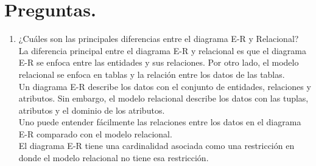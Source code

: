 \documentclass[11pt]{article}
\begin{document}
\section*{Preguntas.}
\begin{enumerate}
    \item ¿Cuáles son las principales diferencias entre el diagrama E-R y Relacional?\\
    La diferencia principal entre el diagrama E-R y relacional es que el diagrama E-R se enfoca entre las entidades y sus relaciones. Por otro lado, el modelo relacional se enfoca en tablas y la relación entre los datos de las tablas.\\
    Un diagrama E-R describe los datos con el conjunto de entidades, relaciones y atributos. Sin embargo, el modelo relacional describe los datos con las tuplas, atributos y el dominio de los atributos.\\
    Uno puede entender fácilmente las relaciones entre los datos en el diagrama E-R comparado con el modelo relacional.\\
    El diagrama E-R tiene una cardinalidad asociada como una restricción en donde el modelo relacional no tiene esa restricción.
    

\end{enumerate}
\end{document}

